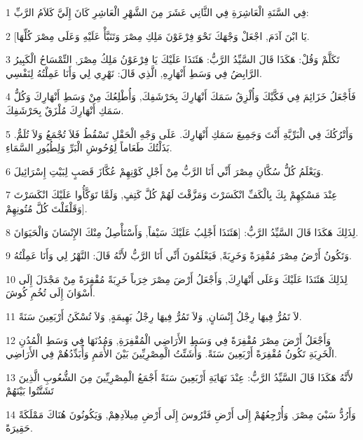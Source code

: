 \par 1 فِي السَّنَةِ الْعَاشِرَةِ فِي الثَّانِي عَشَرَ مِنَ الشَّهْرِ الْعَاشِرِ كَانَ إِلَيَّ كَلاَمُ الرَّبِّ:
\par 2 [يَا ابْنَ آدَمَ, اجْعَلْ وَجْهَكَ نَحْوَ فِرْعَوْنَ مَلِكِ مِصْرَ وَتَنَبَّأْ عَلَيْهِ وَعَلَى مِصْرَ كُلِّهَا.
\par 3 تَكَلَّمْ وَقُلْ: هَكَذَا قَالَ السَّيِّدُ الرَّبُّ: هَئَنَذَا عَلَيْكَ يَا فِرْعَوْنُ مَلِكُ مِصْرَ, التِّمْسَاحُ الْكَبِيرُ الرَّابِضُ فِي وَسَطِ أَنْهَارِهِ, الَّذِي قَالَ: نَهْرِي لِي وَأَنَا عَمِلْتُهُ لِنَفْسِي.
\par 4 فَأَجْعَلُ خَزَائِمَ فِي فَكَّيْكَ وَأُلْزِقُ سَمَكَ أَنْهَارِكَ بِحَرْشَفِكَ, وَأُطْلِعُكَ مِنْ وَسَطِ أَنْهَارِكَ وَكُلُّ سَمَكِ أَنْهَارِكَ مُلْزَقٌ بِحَرْشَفِكَ.
\par 5 وَأَتْرُكُكَ فِي الْبَرِّيَّةِ أَنْتَ وَجَمِيعَ سَمَكِ أَنْهَارِكَ. عَلَى وَجْهِ الْحَقْلِ تَسْقُطُ فَلاَ تُجْمَعُ وَلاَ تُلَمُّ. بَذَلْتُكَ طَعَاماً لِوُحُوشِ الْبَرِّ وَلِطُيُورِ السَّمَاءِ.
\par 6 وَيَعْلَمُ كُلُّ سُكَّانِ مِصْرَ أَنِّي أَنَا الرَّبُّ مِنْ أَجْلِ كَوْنِهِمْ عُكَّازَ قَصَبٍ لِبَيْتِ إِسْرَائِيلَ.
\par 7 عِنْدَ مَسْكِهِمْ بِكَ بِالْكَفِّ انْكَسَرْتَ وَمَزَّقْتَ لَهُمْ كُلَّ كَتِفٍ, وَلَمَّا تَوَكَّأُوا عَلَيْكَ انْكَسَرْتَ وَقَلْقَلْتَ كُلَّ مُتُونِهِمْ].
\par 8 لِذَلِكَ هَكَذَا قَالَ السَّيِّدُ الرَّبُّ: [هَئَنَذَا أَجْلِبُ عَلَيْكَ سَيْفاً, وَأَسْتَأْصِلُ مِنْكَ الإِنْسَانَ وَالْحَيَوَانَ.
\par 9 وَتَكُونُ أَرْضُ مِصْرَ مُقْفِرَةً وَخَرِبَةً, فَيَعْلَمُونَ أَنِّي أَنَا الرَّبُّ لأَنَّهُ قَالَ: النَّهْرُ لِي وَأَنَا عَمِلْتُهُ.
\par 10 لِذَلِكَ هَئَنَذَا عَلَيْكَ وَعَلَى أَنْهَارِكَ, وَأَجْعَلُ أَرْضَ مِصْرَ خِرَباً خَرِبَةً مُقْفِرَةً مِنْ مَجْدَلَ إِلَى أَسْوَانَ إِلَى تُخُمِ كُوشَ.
\par 11 لاَ تَمُرُّ فِيهَا رِجْلُ إِنْسَانٍ, وَلاَ تَمُرُّ فِيهَا رِجْلُ بَهِيمَةٍ, وَلاَ تُسْكَنُ أَرْبَعِينَ سَنَةً.
\par 12 وَأَجْعَلُ أَرْضَ مِصْرَ مُقْفِرَةً فِي وَسَطِ الأَرَاضِي الْمُقْفِرَةِ, وَمُدُنَهَا فِي وَسَطِ الْمُدُنِ الْخَرِبَةِ تَكُونُ مُقْفِرَةً أَرْبَعِينَ سَنَةً. وَأُشَتِّتُ الْمِصْرِيِّينَ بَيْنَ الأُمَمِ وَأُبَدِّدُهُمْ فِي الأَرَاضِي.
\par 13 لأَنَّهُ هَكَذَا قَالَ السَّيِّدُ الرَّبُّ: عِنْدَ نَهَايَةِ أَرْبَعِينَ سَنَةً أَجْمَعُ الْمِصْرِيِّينَ مِنَ الشُّعُوبِ الَّذِينَ تَشَتَّتُوا بَيْنَهُمْ
\par 14 وَأَرُدُّ سَبْيَ مِصْرَ, وَأُرْجِعُهُمْ إِلَى أَرْضِ فَتْرُوسَ إِلَى أَرْضِ مِيلاَدِهِمْ, وَيَكُونُونَ هُنَاكَ مَمْلَكَةً حَقِيرَةً.
